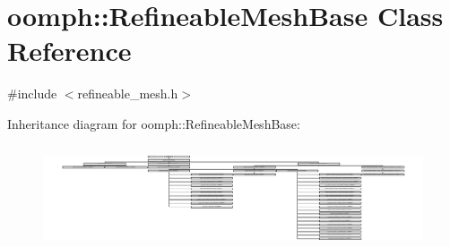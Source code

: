 \hypertarget{classoomph_1_1RefineableMeshBase}{}\section{oomph\+:\+:Refineable\+Mesh\+Base Class Reference}
\label{classoomph_1_1RefineableMeshBase}


{\ttfamily \#include $<$refineable\+\_\+mesh.\+h$>$}

Inheritance diagram for oomph\+:\+:Refineable\+Mesh\+Base\+:\begin{figure}[H]
\begin{center}
\leavevmode
\includegraphics[height=3.111111cm]{classoomph_1_1RefineableMeshBase}
\end{center}
\end{figure}
